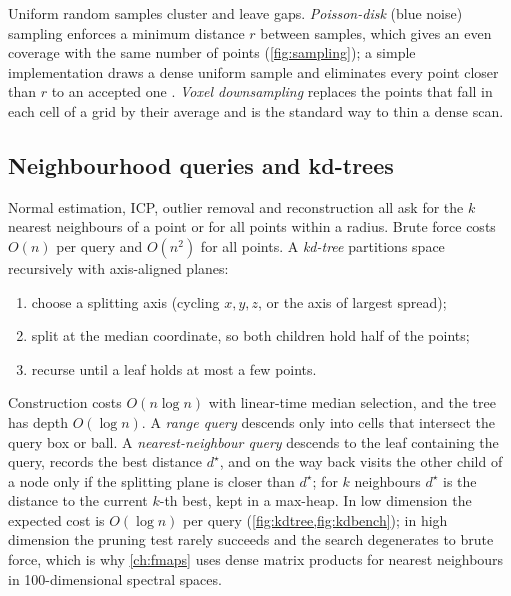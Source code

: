 Uniform random samples cluster and leave gaps. \emph{Poisson-disk} (blue noise) sampling enforces a
minimum distance $r$ between samples, which gives an even coverage with the same number of points
(\cref{fig:sampling}); a simple implementation draws a dense uniform sample and eliminates every
point closer than $r$ to an accepted one \citep{Bridson2007}. \emph{Voxel downsampling} replaces
the points that fall in each cell of a grid by their average and is the standard way to thin a
dense scan.


\subsection{Neighbourhood queries and kd-trees}

Normal estimation, ICP, outlier removal and reconstruction all ask for the $k$ nearest neighbours
of a point or for all points within a radius. Brute force costs $O(n)$ per query and $O(n^2)$ for
all points. A \emph{kd-tree} \citep{Bentley1975,Friedman1977} partitions space recursively with
axis-aligned planes:
\begin{enumerate}
  \item choose a splitting axis (cycling $x,y,z$, or the axis of largest spread);
  \item split at the median coordinate, so both children hold half of the points;
  \item recurse until a leaf holds at most a few points.
\end{enumerate}
Construction costs $O(n\log n)$ with linear-time median selection, and the tree has depth
$O(\log n)$. A \emph{range query} descends only into cells that intersect the query box or ball. A
\emph{nearest-neighbour query} descends to the leaf containing the query, records the best
distance $d^\star$, and on the way back visits the other child of a node only if the splitting
plane is closer than $d^\star$; for $k$ neighbours $d^\star$ is the distance to the current
$k$-th best, kept in a max-heap. In low dimension the expected cost is $O(\log n)$ per query
(\cref{fig:kdtree,fig:kdbench}); in high dimension the pruning test rarely succeeds and the search
degenerates to brute force, which is why \cref{ch:fmaps} uses dense matrix products for
nearest neighbours in 100-dimensional spectral spaces.

